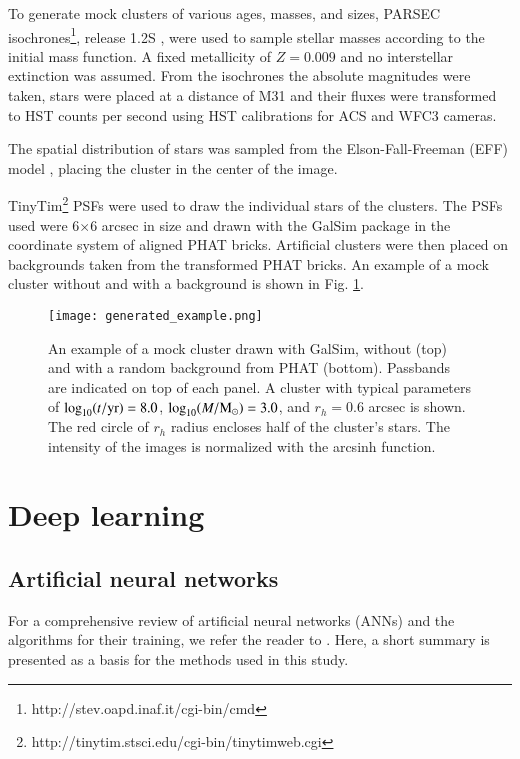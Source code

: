\documentclass{aa}
\begin{document}
To generate mock clusters of various ages, masses, and sizes, PARSEC isochrones\footnote{http://stev.oapd.inaf.it/cgi-bin/cmd}, release 1.2S \citep{2012MNRAS.427..127B}, were used to sample stellar masses according to the \cite{2001MNRAS.322..231K} initial mass function. A fixed metallicity of $Z=0.009$ and no interstellar extinction was assumed. From the isochrones the absolute magnitudes were taken, stars were placed at a distance of M31 \citep[785 kpc]{2005MNRAS.356..979M} and their fluxes were transformed to HST counts per second using HST calibrations for ACS \citep{2017acsi.book.....A} and WFC3 \citep{2012wfci.book.....D} cameras.

The spatial distribution of stars was sampled from the Elson-Fall-Freeman (EFF) model \citep{1987ApJ...323...54E}, placing the cluster in the center of the image.

TinyTim\footnote{http://tinytim.stsci.edu/cgi-bin/tinytimweb.cgi} PSFs \citep{2011SPIE.8127E..0JK} were used to draw the individual stars of the clusters. The PSFs used were 6$\times$6 arcsec in size and drawn with the GalSim package \citep{2015A&C....10..121R} in the coordinate system of aligned PHAT bricks. Artificial clusters were then placed on backgrounds taken from the transformed PHAT bricks. An example of a mock cluster without and with a background is shown in Fig. \ref{fig:generated_example}.


\begin{figure}
    \centering
    \texttt{[image: generated\_example.png]}
    \caption{An example of a mock cluster drawn with GalSim, without (top) and with a random background from PHAT (bottom). Passbands are indicated on top of each panel. A cluster with typical parameters of $\log_{10}(t/{\rm yr})=8.0$, $\log_{10}(M/{\rm M_\odot})=3.0$, and $r_h=0.6$ arcsec is shown. The red circle of $r_h$ radius encloses half of the cluster's stars. The intensity of the images is normalized with the arcsinh function.}
    \label{fig:generated_example}
\end{figure}

\section{Deep learning} \label{sec:deep_learning}
\subsection{Artificial neural networks}
For a comprehensive review of artificial neural networks (ANNs) and the algorithms for their training, we refer the reader to \cite{haykin2009neural}. Here, a short summary is presented as a basis for the methods used in this study.
\end{document}
